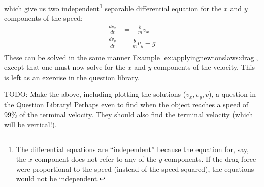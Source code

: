 which give us two independent\footnote{The differential equations are ``independent'' because the equation for, say, the $x$ component does not refer to any of the $y$ components. If the drag force were proportional to the speed (instead of the speed squared), the equations would not be independent.} separable differential equation for the $x$ and $y$ components of the speed:
\begin{align*}
\frac{dv_x}{dt} &=-\frac{b}{m}v_x\\
\frac{dv_y}{dt} &= \frac{b}{m}v_y-g\\
\end{align*}
These can be solved in the same manner Example \ref{ex:applyingnewtonslaws:drag}, except that one must now solve for the $x$ and $y$ components of the velocity. This is left as an exercise in the question library.

TODO: Make the above, including plotting the solutions ($v_x, v_y, v$), a question in the Question Library! Perhaps even to find when the object reaches a speed of 99\% of the terminal velocity. They should also find the terminal velocity (which will be vertical!).


